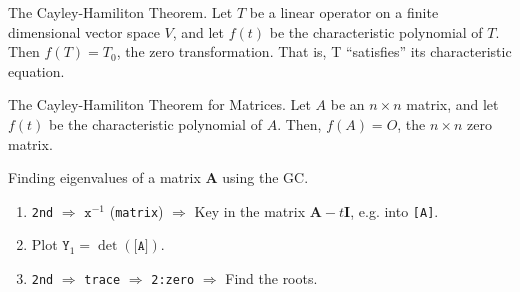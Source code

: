 \documentclass[../Notes.tex]{subfiles}
\begin{document}
\begin{theorem}{The Cayley-Hamiliton Theorem.}{}
    Let \(T\) be a linear operator on a finite dimensional vector space \(V\), and let \(f(t)\) be the characteristic polynomial of \(T\). Then \(f(T)=T_0\), the zero transformation. That is, T ``satisfies'' its characteristic equation.
\end{theorem}
\begin{corollary}{The Cayley-Hamiliton Theorem for Matrices.}{}
    Let \(A\) be an \(n\times n\) matrix, and let \(f(t)\) be the characteristic polynomial of \(A\). Then, \(f(A)=O\), the \(n\times n\) zero matrix.  
\end{corollary}
\hypertarget{characteristic-polynomial-roots}{}
\begin{GCSkills}{}
    Finding eigenvalues of a matrix \(\mathbf{A}\) using the GC.
    \begin{enumerate}
        \item \texttt{2nd} \(\Longrightarrow\) \(\texttt{x}^{-1}\) (\texttt{matrix}) \(\Longrightarrow\) Key in the matrix \(\mathbf{A}-t\mathbf{I}\), e.g. into \texttt{[A]}. 
        \item Plot \(\texttt{Y}_1=\det{(\texttt{[A]})}\).
        \item \texttt{2nd} \(\Longrightarrow\) \texttt{trace} \(\Longrightarrow\) \texttt{2:zero} \(\Longrightarrow\) Find the roots.
    \end{enumerate}
\end{GCSkills}
    
\end{document}
